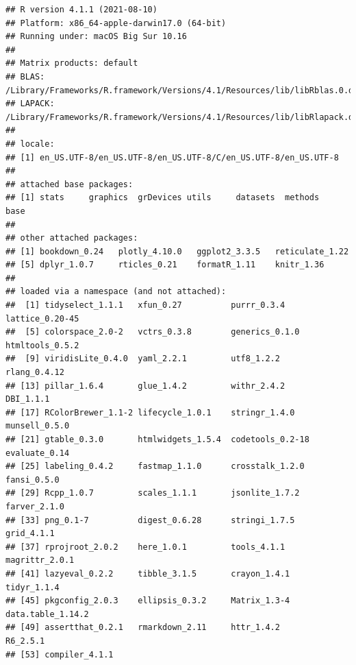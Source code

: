 \documentclass{article}
\begin{document}
\begin{verbatim}
## R version 4.1.1 (2021-08-10)
## Platform: x86_64-apple-darwin17.0 (64-bit)
## Running under: macOS Big Sur 10.16
## 
## Matrix products: default
## BLAS:   /Library/Frameworks/R.framework/Versions/4.1/Resources/lib/libRblas.0.dylib
## LAPACK: /Library/Frameworks/R.framework/Versions/4.1/Resources/lib/libRlapack.dylib
## 
## locale:
## [1] en_US.UTF-8/en_US.UTF-8/en_US.UTF-8/C/en_US.UTF-8/en_US.UTF-8
## 
## attached base packages:
## [1] stats     graphics  grDevices utils     datasets  methods   base     
## 
## other attached packages:
## [1] bookdown_0.24   plotly_4.10.0   ggplot2_3.3.5   reticulate_1.22
## [5] dplyr_1.0.7     rticles_0.21    formatR_1.11    knitr_1.36     
## 
## loaded via a namespace (and not attached):
##  [1] tidyselect_1.1.1   xfun_0.27          purrr_0.3.4        lattice_0.20-45   
##  [5] colorspace_2.0-2   vctrs_0.3.8        generics_0.1.0     htmltools_0.5.2   
##  [9] viridisLite_0.4.0  yaml_2.2.1         utf8_1.2.2         rlang_0.4.12      
## [13] pillar_1.6.4       glue_1.4.2         withr_2.4.2        DBI_1.1.1         
## [17] RColorBrewer_1.1-2 lifecycle_1.0.1    stringr_1.4.0      munsell_0.5.0     
## [21] gtable_0.3.0       htmlwidgets_1.5.4  codetools_0.2-18   evaluate_0.14     
## [25] labeling_0.4.2     fastmap_1.1.0      crosstalk_1.2.0    fansi_0.5.0       
## [29] Rcpp_1.0.7         scales_1.1.1       jsonlite_1.7.2     farver_2.1.0      
## [33] png_0.1-7          digest_0.6.28      stringi_1.7.5      grid_4.1.1        
## [37] rprojroot_2.0.2    here_1.0.1         tools_4.1.1        magrittr_2.0.1    
## [41] lazyeval_0.2.2     tibble_3.1.5       crayon_1.4.1       tidyr_1.1.4       
## [45] pkgconfig_2.0.3    ellipsis_0.3.2     Matrix_1.3-4       data.table_1.14.2 
## [49] assertthat_0.2.1   rmarkdown_2.11     httr_1.4.2         R6_2.5.1          
## [53] compiler_4.1.1
\end{verbatim}



\end{document}
